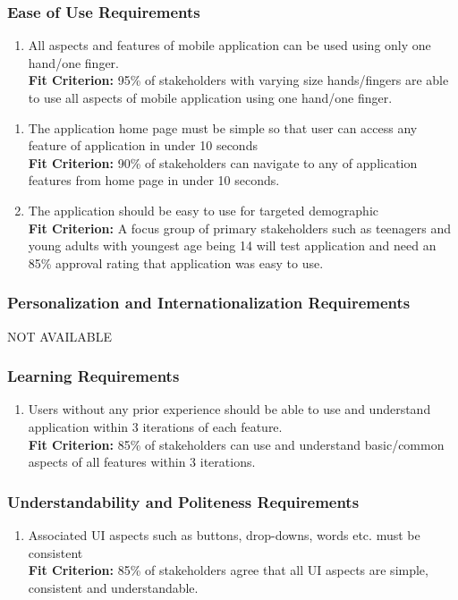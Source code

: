 \documentclass[12pt,letterpaper]{article}
\begin{document}
\subsubsection{Ease of Use Requirements}
\begin{enumerate}[{UH}1.] 
	\item All aspects and features of mobile application can be used using only one hand/one finger.\\
	{\textbf{Fit Criterion:} 95\% of stakeholders with varying size hands/fingers are able to use all aspects of mobile application using one hand/one finger.}
\end{enumerate}
\begin{enumerate}[resume*]  
	\item The application home page must be simple so that user can access any feature of application in under 10 seconds\\
	{\textbf{Fit Criterion:} 90\% of stakeholders can navigate to any of application features from home page in under 10 seconds. }
	\item The application should be easy to use for targeted demographic\\
	{\textbf{Fit Criterion:} A focus group of primary stakeholders such as teenagers and young adults with youngest age being 14 will test application and need an 85\% approval rating that application was easy to use. }
\end{enumerate}

\subsubsection{Personalization and Internationalization Requirements}
\noindent NOT AVAILABLE

\subsubsection{Learning Requirements}
\begin{enumerate}[resume*] 
	\item Users without any prior experience should be able to use and understand application within 3 iterations of each feature.\\
	{\textbf{Fit Criterion:} 85\% of stakeholders can use and understand basic/common aspects of all features within 3 iterations.}
\end{enumerate}

\subsubsection{Understandability and Politeness Requirements}
\begin{enumerate}[resume*] 
	\item Associated UI aspects such as buttons, drop-downs, words etc. must be consistent\\
	{\textbf{Fit Criterion:} 85\% of stakeholders agree that all UI aspects are simple, consistent and understandable.}
\end{enumerate}
\end{document}
